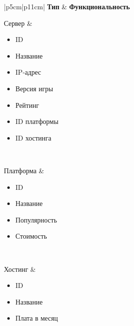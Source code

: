 \captionsetup{justification=raggedleft,singlelinecheck=off}
\begin{table}[H]
    \centering
	\caption{Модели базы данных}
    \label{tbl:db_tables}
	\begin{tabular}{|p{5cm}|p{11cm}|}
        \hline
        \textbf{Тип} & \textbf{Функциональность} \\ \hline
        
        Сервер &
            \begin{minipage}[t]{\linewidth}
                \begin{itemize}[nosep,after=\strut]
                    \item ID
                    \item Название
                    \item IP-адрес
                    \item Версия игры
                    \item Рейтинг
                    \item ID платформы
                    \item ID хостинга
                \end{itemize}
            \end{minipage}
        \\ \hline

        Платформа &
            \begin{minipage}[t]{\linewidth}
                \begin{itemize}[nosep,after=\strut]
                    \item ID
                    \item Название
                    \item Популярность
                    \item Стоимость
                \end{itemize}
            \end{minipage}
        \\ \hline

        Хостинг &
            \begin{minipage}[t]{\linewidth}
                \begin{itemize}[nosep,after=\strut]
                    \item ID
                    \item Название
                    \item Плата в месяц
                \end{itemize}
            \end{minipage}
        \\ \hline


\end{tabular}
\end{table}
